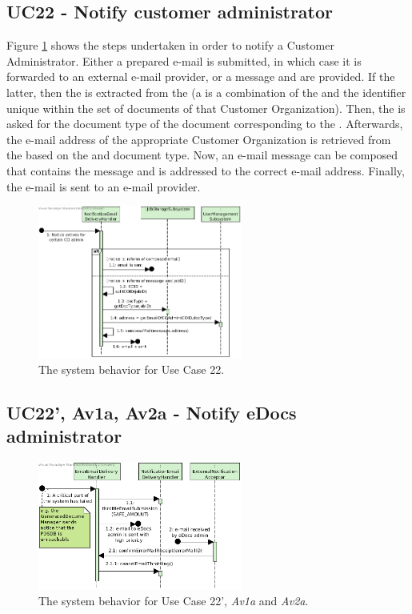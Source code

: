 \subsection{UC22 - Notify customer administrator}
Figure \ref{fig:seq_uc22} shows the steps undertaken in order to notify a Customer Administrator. Either a prepared e-mail is submitted, in which case it is forwarded to an external e-mail provider, or a message and  are provided. If the latter, then the  is extracted from the  (a  is a combination of the  and the identifier unique within the set of documents of that Customer Organization). Then, the  is asked for the document type of the document corresponding to the . Afterwards, the e-mail address of the appropriate Customer Organization is retrieved from the  based on the  and document type. Now, an e-mail message can be composed that contains the message and is addressed to the correct e-mail address. Finally, the e-mail is sent to an e-mail provider.

\begin{figure}[!htp]
    \centering
    \includegraphics[width=0.6\textwidth]{figures/UC22 - Notify CO administrator.png}
    \caption{The system behavior for Use Case 22.
        }\label{fig:seq_uc22}
\end{figure}

\subsection{UC22', Av1a, Av2a - Notify eDocs administrator}

\begin{figure}[!htp]
    \centering
    \includegraphics[width=0.6\textwidth]{figures/Av1a_2a UC22' - Notify eDocs Admin.png}
    \caption{The system behavior for Use Case 22', \emph{Av1a} and \emph{Av2a}.
        }\label{fig:seq_uc22'}
\end{figure}
